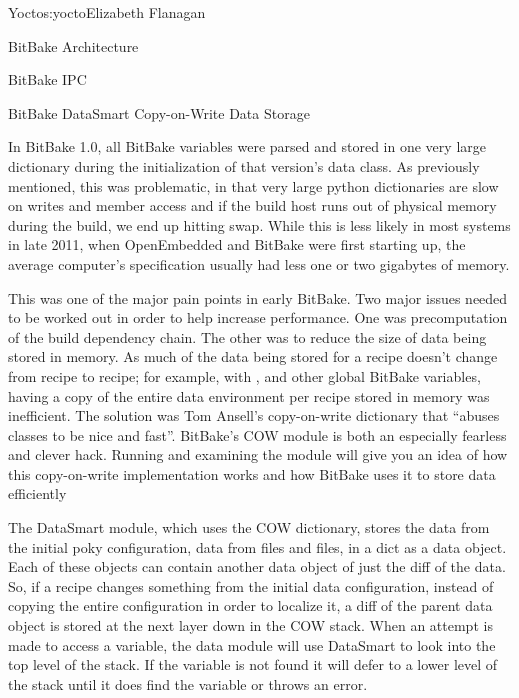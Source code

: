 \begin{aosachapter}{Yocto}{s:yocto}{Elizabeth Flanagan}
\begin{aosasect1}{BitBake Architecture}
\begin{aosasect2}{BitBake IPC}
\end{aosasect2}

\begin{aosasect2}{BitBake DataSmart Copy-on-Write Data Storage}


In BitBake 1.0, all BitBake variables were parsed and stored in one
very large dictionary during the initialization of that version's data
class. As previously mentioned, this was problematic, in that very
large python dictionaries are slow on writes and member access and if
the build host runs out of physical memory during the build, we end up
hitting swap. While this is less likely in most systems in late 2011,
when OpenEmbedded and BitBake were first starting up, the average
computer's specification usually had less one or two
gigabytes of memory.

This was one of the major pain points in early BitBake. Two major
issues needed to be worked out in order to help increase performance.
One was precomputation of the build dependency chain. The other was to
reduce the size of data being stored in memory. As much of the data
being stored for a recipe doesn't change from recipe to recipe; for
example, with ,  and other global BitBake
variables, having a copy of the entire data environment per recipe
stored in memory was inefficient. The solution was Tom Ansell's
copy-on-write dictionary that ``abuses classes to be nice and fast''.
BitBake's COW module is both an especially fearless and clever hack.
Running  and examining the module will
give you an idea of how this copy-on-write implementation works and
how BitBake uses it to store data efficiently

The DataSmart module, which uses the COW dictionary, stores the
data from the initial poky configuration, data from  files and
 files, in a dict as a data object. Each of these objects can
contain another data object of just the diff of the data. So, if a
recipe changes something from the initial data configuration, instead
of copying the entire configuration in order to localize it, a diff of
the parent data object is stored at the next layer down in the
COW stack. When an attempt is made to access a variable, the data
module will use DataSmart to look into the top level of the stack. If
the variable is not found it will defer to a lower level of the stack
until it does find the variable or throws an error.


\end{aosasect2}
\end{aosasect1}
\end{aosachapter}
